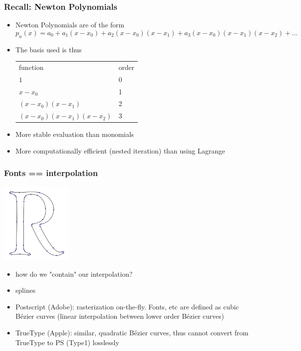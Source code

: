 \documentclass[10pt]{beamer}
\begin{document}
\begin{frame}
\frametitle{Recall: Newton Polynomials}
\begin{itemize}
\item Newton Polynomials are of the form
  \begin{equation*}
    p_n(x) = a_0 + a_1(x-x_0) + a_2(x-x_0)(x-x_1) + a_3(x-x_0)(x-x_1)(x-x_2) + \dots
  \end{equation*}

\item The basis used is thus
\begin{center}
  \begin{tabular}{l l}
  function & order \\
  $1$ & 0\\
  $x-x_0$ & 1\\
  $(x-x_0)(x-x_1)$ & 2\\
  $(x-x_0)(x-x_1)(x-x_2)$ & 3\\
  \end{tabular}
\end{center}

\item More stable evaluation than monomials
\item More computationally efficient (nested iteration) than using Lagrange
\end{itemize}
\end{frame}
\begin{frame}
\frametitle{Fonts == interpolation}
\begin{center}
  \includegraphics[height=4cm]{./figs/font}
\end{center}
\begin{itemize}
  \item how do we "contain" our interpolation?
  \item splines
  \item Postscript (Adobe): rasterization on-the-fly.  Fonts, etc are defined as
cubic B\'ezier curves (linear interpolation between lower order B\'ezier curves)
  \item TrueType (Apple): similar, quadratic B\'ezier curves, thus cannot
convert from TrueType to PS (Type1) losslessly
\end{itemize}
\end{frame}
\end{document}
